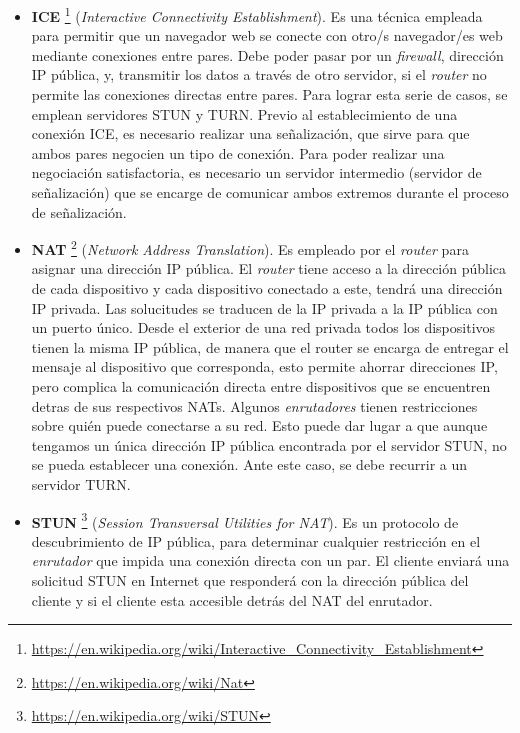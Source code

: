 \documentclass[a4paper, 12pt]{book}
\begin{document}
\begin{itemize}
\item \textbf{ICE} \footnote{\url{https://en.wikipedia.org/wiki/Interactive_Connectivity_Establishment}} (\textit{Interactive Connectivity Establishment}). Es una técnica empleada para permitir que un navegador web se conecte con otro/s navegador/es web mediante conexiones entre pares. Debe poder pasar por un \textit{firewall}, dirección IP pública, y, transmitir los datos a través de otro servidor, si el \textit{router} no permite las conexiones directas entre pares. Para lograr esta serie de casos, se emplean servidores STUN y TURN. Previo al establecimiento de una conexión ICE, es necesario realizar una señalización, que sirve para que ambos pares negocien un tipo de conexión. Para poder realizar una negociación satisfactoria, es necesario un servidor intermedio (servidor de señalización) que se encarge de comunicar ambos extremos durante el proceso de señalización.

\item \textbf{NAT} \footnote{\url{https://en.wikipedia.org/wiki/Nat}} (\textit{Network Address Translation}). Es empleado por el \textit{router} para asignar una dirección IP pública. El \textit{router} tiene acceso a la dirección pública de cada dispositivo y cada dispositivo conectado a este, tendrá una dirección IP privada. Las solucitudes se traducen de la IP privada a la IP pública con un puerto único. Desde el exterior de una red privada todos los dispositivos tienen la misma IP pública, de manera que el router se encarga de entregar el mensaje al dispositivo que corresponda, esto permite ahorrar direcciones IP, pero complica la comunicación directa entre dispositivos que se encuentren detras de sus respectivos NATs. Algunos \textit{enrutadores} tienen restricciones sobre quién puede conectarse a su red. Esto puede dar lugar a que aunque tengamos un única dirección IP pública encontrada por el servidor STUN, no se pueda establecer una conexión. Ante este caso, se debe recurrir a un servidor TURN.

\item \textbf{STUN} \footnote{\url{https://en.wikipedia.org/wiki/STUN}} (\textit{Session Transversal Utilities for NAT}). Es un protocolo de descubrimiento de IP pública, para determinar cualquier restricción en el \textit{enrutador} que impida una conexión directa con un par. El cliente enviará una solicitud STUN en Internet que responderá con la dirección pública del cliente y si el cliente esta accesible detrás del NAT del enrutador.


\end{itemize}
\end{document}
